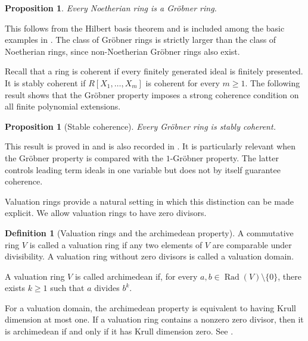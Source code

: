 \documentclass[preprint,12pt,3p]{elsarticle}
\newtheorem{proposition}[theorem]{Proposition}
\theoremstyle{definition}
\newtheorem{definition}[theorem]{Definition}
\theoremstyle{remark}
\begin{document}
	\begin{proposition}
		\label{prop:noetherian-grobner}
		Every Noetherian ring is a Gr\"obner ring.
	\end{proposition}
	
	This follows from the Hilbert basis theorem and is included among the
	basic examples in \cite[Example~216]{Yengui2015Book}. The class of
	Gr\"obner rings is strictly larger than the class of Noetherian
	rings, since non-Noetherian Gr\"obner rings also exist.
	
	Recall that a ring is coherent if every finitely generated ideal is
	finitely presented. It is stably coherent if
	$R[X_1,\ldots,X_m]$ is coherent for every $m\geq 1$. The following
	result shows that the Gr\"obner property imposes a strong coherence
	condition on all finite polynomial extensions.
	
	\begin{proposition}[Stable coherence]
		\label{prop:grobner-stably-coherent}
		Every Gr\"obner ring is stably coherent.
	\end{proposition}
	
	This result is proved in \cite{PolaYengui2014} and is also recorded
	in \cite[Proposition~224]{Yengui2015Book}. It is particularly
	relevant when the Gr\"obner property is compared with the
	$1$-Gr\"obner property. The latter controls leading term ideals in
	one variable but does not by itself guarantee coherence.
	
	Valuation rings provide a natural setting in which this distinction
	can be made explicit. We allow valuation rings to have zero
	divisors.
	
	\begin{definition}[Valuation rings and the archimedean property]
		\label{def:valuation-ring-archimedean}
		A commutative ring $V$ is called a valuation ring if any two
		elements of $V$ are comparable under divisibility. A valuation
		ring without zero divisors is called a valuation domain.
		
		A valuation ring $V$ is called archimedean if, for every
		$a,b\in\operatorname{Rad}(V)\setminus\{0\}$, there exists
		$k\geq 1$ such that $a$ divides $b^k$.
	\end{definition}
	
	For a valuation domain, the archimedean property is equivalent to
	having Krull dimension at most one. If a valuation ring contains a
	nonzero zero divisor, then it is archimedean if and only if it has
	Krull dimension zero. See
	\cite[Propositions~264 and~265]{Yengui2015Book}.
	
\end{document}

